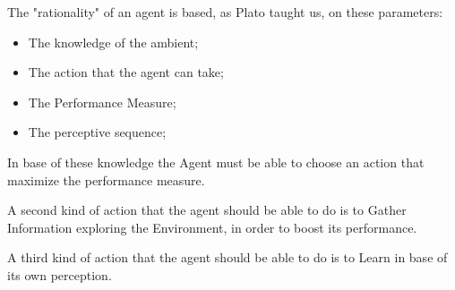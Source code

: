 The "rationality" of an agent is based, as Plato taught us, on these parameters:
\begin{itemize}
  \item The knowledge of the ambient;
  \item The action that the agent can take;
  \item The Performance Measure;
  \item The perceptive sequence;
\end{itemize}

In base of these knowledge the Agent must be able to choose an action that maximize the performance measure.

A second kind of action that the agent should be able to do is to Gather Information exploring the Environment, in order to boost its performance.

A third kind of action that the agent should be able to do is to Learn in base of its own perception.

